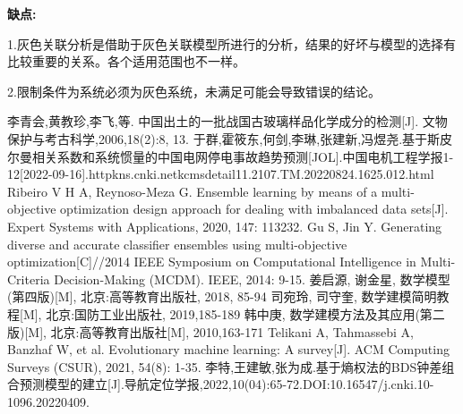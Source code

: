\documentclass[UTF8]{ctexart}
\begin{document}
\textbf{缺点:}

1.灰色关联分析是借助于灰色关联模型所进行的分析，结果的好坏与模型的选择有比较重要的关系。各个适用范围也不一样。

2.限制条件为系统必须为灰色系统，未满足可能会导致错误的结论。





\newpage

\begin{thebibliography}{100}

    李青会,黄教珍,李飞,等. 中国出土的一批战国古玻璃样品化学成分的检测[J]. 文物保护与考古科学,2006,18(2):8, 13.
    于群,霍筱东,何剑,李琳,张建新,冯煜尧.基于斯皮尔曼相关系数和系统惯量的中国电网停电事故趋势预测[JOL].中国电机工程学报1-12[2022-09-16].httpkns.cnki.netkcmsdetail11.2107.TM.20220824.1625.012.html
    Ribeiro V H A, Reynoso-Meza G. Ensemble learning by means of a multi-objective optimization design approach for dealing with imbalanced data sets[J]. Expert Systems with Applications, 2020, 147: 113232.
    Gu S, Jin Y. Generating diverse and accurate classifier ensembles using multi-objective optimization[C]//2014 IEEE Symposium on Computational Intelligence in Multi-Criteria Decision-Making (MCDM). IEEE, 2014: 9-15.
    姜启源, 谢金星, 数学模型(第四版)[M], 北京:高等教育出版社, 2018, 85-94
    司宛玲, 司守奎, 数学建模简明教程[M], 北京:国防工业出版社, 2019,185-189
    韩中庚, 数学建模方法及其应用(第二版)[M], 北京:高等教育出版社[M], 2010,163-171
    Telikani A, Tahmassebi A, Banzhaf W, et al. Evolutionary machine learning: A survey[J]. ACM Computing Surveys (CSUR), 2021, 54(8): 1-35.
    李特,王建敏,张为成.基于熵权法的BDS钟差组合预测模型的建立[J].导航定位学报,2022,10(04):65-72.DOI:10.16547/j.cnki.10-1096.20220409.

\end{thebibliography}
\newpage
\end{document}
